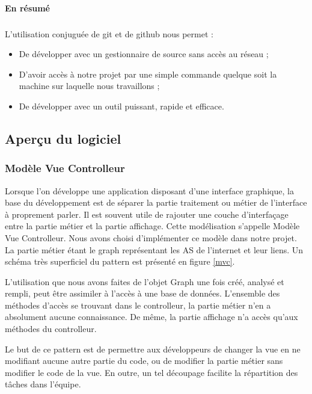 \paragraph{En résumé}

\subparagraph{}L'utilisation conjuguée de git et de github nous permet :
\begin{itemize}
 \item De développer avec un gestionnaire de source sans accès au réseau ;
 \item D'avoir accès à notre projet par une simple commande quelque soit la machine sur laquelle nous travaillons ;
\item De développer avec un outil puissant, rapide et efficace.
\end{itemize}

\subsection{Aperçu du logiciel}



\subsubsection{Modèle Vue Controlleur}
\label{mvcText}
Lorsque l'on développe une application disposant d'une interface graphique, la base du développement est de séparer la partie traitement ou métier de l'interface à proprement parler. Il est souvent utile de rajouter une couche d'interfaçage entre la partie métier et la partie affichage. Cette modélisation s'appelle Modèle Vue Controlleur. Nous avons choisi d'implémenter ce modèle dans notre projet. La partie métier étant le graph représentant les AS de l'internet et leur liens. Un schéma très superficiel du pattern est présenté en figure \ref{mvc}.

L'utilisation que nous avons faites de l'objet Graph une fois créé, analysé et rempli, peut être assimiler à l'accès à une base de données. L'ensemble des méthodes d'accès se trouvant dans le controlleur, la partie métier n'en a absolument aucune connaissance. De même, la partie affichage n'a accès qu'aux méthodes du controlleur.

Le but de ce pattern est de permettre aux développeurs de changer la vue en ne modifiant aucune autre partie du code, ou de modifier la partie métier sans modifier le code de la vue. En outre, un tel découpage facilite la répartition des tâches dans l'équipe.

